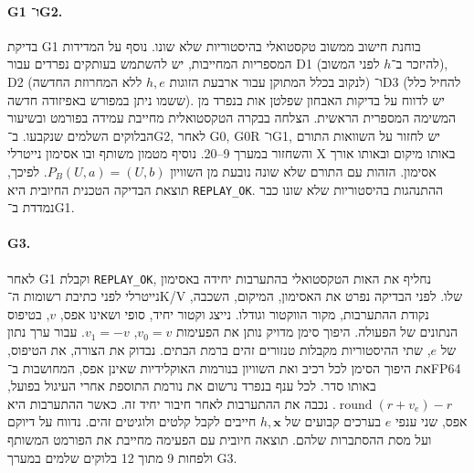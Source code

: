 \documentclass[11pt,a4paper]{article}
\DeclareRobustCommand{\textenglish}[1]{\foreignlanguage{english}{#1}}
\theoremstyle{definition}
\begin{document}
\paragraph{\textenglish{G1} ו־\textenglish{G2}.}
בדיקת \textenglish{G1} בוחנת חישוב ממשוב טקסטואלי בהיסטוריות שלא שונו. נוסף על המדידות המספריות המחייבות, יש להשתמש בעותקים נפרדים עבור \textenglish{D1} (להיזכר ב־$h$ לפני המשוב), \textenglish{D2} (לנקוב בכלל המתוקן עבור ארבעת הזוגות $h,e$ ללא המחרוזת החדשה) ו־\textenglish{D3} (להחיל כלל ששמו ניתן במפורש באפיזודה חדשה). יש לדווח על בדיקות האבחון שפלטן אות בנפרד מן המשימה המספרית הראשית. הצלחה בבקרה הטקסטואלית מחייבת עמידה בפורמט ובשיעור הבלוקים השלמים שנקבעו. ב־\textenglish{G2}, לאחר \textenglish{G0}, \textenglish{G0R} ו־\textenglish{G1}, יש לחזור על השוואות התורם והשחזור במערך \textenglish{9--20}. נוסיף מטמון משותף ובו אסימון נייטרלי \textenglish{X} באותו מיקום ובאותו אורך אסימון. הזהות עם התורם שלא שונה נובעת מן השוויון $P_B(U,a)=(U,b)$. לפיכך, תוצאת הבדיקה הטכנית החיובית היא \textenglish{\texttt{REPLAY\_OK}}. ההתנהגות בהיסטוריות שלא שונו כבר נמדדת ב־\textenglish{G1}.

\paragraph{\textenglish{G3}.}
לאחר \textenglish{G1} וקבלת \textenglish{\texttt{REPLAY\_OK}}, נחליף את האות הטקסטואלי בהתערבות יחידה באסימון נייטרלי לפני כתיבת רשומות ה־\textenglish{K/V} שלו. לפני הבדיקה נפרט את האסימון, המיקום, השכבה, נקודת ההתערבות, מקור הווקטור וגודלו. נייצג וקטור יחיד, סופי ושאינו אפס, $v$, בטיפוס הנתונים של הפעולה. היפוך סימן מדויק נותן את הפעימות $v_0=v$, $v_1=-v$. עבור ערך נתון של $e$, שתי ההיסטוריות מקבלות טנזורים זהים ברמת הבתים. נבדוק את הצורה, את הטיפוס, את היפוך הסימן לכל רכיב ואת השוויון בנורמות האוקלידיות שאינן אפס, המחושבות ב־\textenglish{FP64} באותו סדר. לכל ענף בנפרד נרשום את נורמת התוספת אחרי העיגול בפועל, $\operatorname{round}(r+v_e)-r$. נכבה את ההתערבות לאחר חיבור יחיד זה. כאשר ההתערבות היא אפס, שני ענפי $e$ בערכים קבועים של $h,\mathbf{x}$ חייבים לקבל קלטים ולוגיטים זהים. נדווח על דיוקם ועל מסת ההסתברות שלהם. תוצאה חיובית עם הפעימה מחייבת את הפורמט המשותף ולפחות 9 מתוך 12 בלוקים שלמים במערך \textenglish{G3}.
\end{document}

